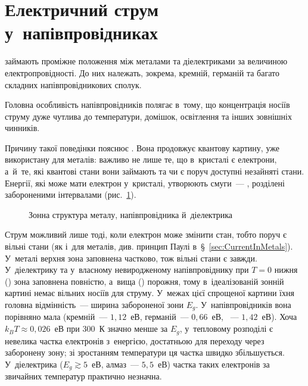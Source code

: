 \section{Електричний струм у~напівпровідниках}\label{sec:CurrentInSemiconductors}\hypertarget{current-in-semiconductors}{}


 займають проміжне положення між металами та діелектриками за
величиною електропровідності. До них належать, зокрема, кремній, германій та багато
складних напівпровідникових сполук.

Головна особливість напівпровідників полягає в~тому, що концентрація носіїв струму дуже
чутлива до температури, домішок, освітлення та інших зовнішніх чинників.

Причину такої поведінки пояснює . Вона продовжує
квантову картину, уже використану для металів: важливо не лише те, що в~кристалі є електрони,
а~й~те, які квантові стани вони займають та чи є поруч доступні незайняті стани. Енергії,
які може мати електрон у~кристалі, утворюють смуги~--- , розділені забороненими
інтервалами (рис.~\ref{pic:Bands}).

\begin{figure}[h!]\centering
	\caption{Зонна структура металу, напівпровідника й~діелектрика\label{pic:Bands}}
\end{figure}

Струм можливий лише тоді, коли електрон може змінити стан, тобто поруч є вільні стани (як
і~для металів, див. принцип Паулі в~\S~\ref{sec:CurrentInMetals}). У~металі верхня
зона заповнена частково, тож вільні стани є завжди. У~діелектрику та у~власному невиродженому напівпровіднику при
$T=0$ нижня () зона заповнена повністю, а~вища ()
порожня, тому в~ідеалізованій зонній картині немає вільних носіїв для струму. У~межах цієї
спрощеної картини їхня головна відмінність~--- ширина забороненої зони $E_g$.
У~напівпровідників вона порівняно мала (кремній~--- $1{,}12$~еВ, германій~--- $0{,}66$~еВ,
~--- $1{,}42$~еВ). Хоча $k_BT\approx0{,}026$~еВ при $300$~К значно менше за $E_g$,
у~тепловому розподілі є невелика частка електронів з~енергією, достатньою для переходу
через заборонену зону; зі зростанням температури ця частка швидко збільшується.
У~діелектрика ($E_g\gtrsim5$~еВ, алмаз~--- $5{,}5$~еВ) частка таких електронів за звичайних
температур практично незначна.

